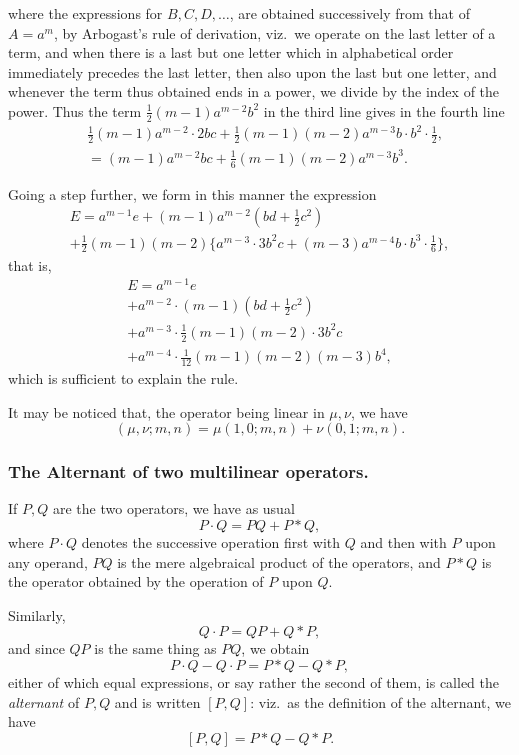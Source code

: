 \documentclass[11pt,a4paper]{book}
\begin{document}
where the expressions for $B, C, D, \ldots$, are obtained successively from that of $A = a^m$,
by Arbogast's rule of derivation, viz.\ we operate on the last letter of a term, and
when there is a last but one letter which in alphabetical order immediately precedes
the last letter, then also upon the last but one letter, and whenever the term thus
obtained ends in a power, we divide by the index of the power. Thus the term
$\frac{1}{2}(m-1)a^{m-2}b^2$ in the third line gives in the fourth line
\begin{align*}
&\tfrac{1}{2}(m-1)a^{m-2} \cdot 2bc + \tfrac{1}{2}(m-1)(m-2)a^{m-3}b \cdot b^2 \cdot \tfrac{1}{2}, \\
&= (m-1)a^{m-2}bc + \tfrac{1}{6}(m-1)(m-2)a^{m-3}b^3.
\end{align*}

\newpage
\noindent Going a step further, we form in this manner the expression
\begin{multline*}
E = a^{m-1}e + (m-1)a^{m-2}(bd + \tfrac{1}{2}c^2) \\
+ \tfrac{1}{2}(m-1)(m-2)\{a^{m-3} \cdot 3b^2c + (m-3)a^{m-4}b \cdot b^3 \cdot \tfrac{1}{6}\},
\end{multline*}
that is,
\begin{multline*}
E = a^{m-1}e \\
+ a^{m-2} \cdot (m-1)(bd + \tfrac{1}{2}c^2) \\
+ a^{m-3} \cdot \tfrac{1}{2}(m-1)(m-2) \cdot 3b^2c \\
+ a^{m-4} \cdot \tfrac{1}{12}(m-1)(m-2)(m-3)b^4,
\end{multline*}
which is sufficient to explain the rule.

It may be noticed that, the operator being linear in $\mu, \nu$, we have
\[
(\mu, \nu; m, n) = \mu(1, 0; m, n) + \nu(0, 1; m, n).
\]

\subsubsection*{The Alternant of two multilinear operators.}

If $P, Q$ are the two operators, we have as usual
\[
P \cdot Q = PQ + P * Q,
\]
where $P \cdot Q$ denotes the successive operation first with $Q$ and then with $P$ upon any
operand, $PQ$ is the mere algebraical product of the operators, and $P * Q$ is the operator
obtained by the operation of $P$ upon $Q$.

Similarly,
\[
Q \cdot P = QP + Q * P,
\]
and since $QP$ is the same thing as $PQ$, we obtain
\[
P \cdot Q - Q \cdot P = P * Q - Q * P,
\]
either of which equal expressions, or say rather the second of them, is called the
\textit{alternant} of $P, Q$ and is written $[P, Q]$: viz.\ as the definition of the alternant, we have
\[
[P, Q] = P * Q - Q * P.
\]
\end{document}
